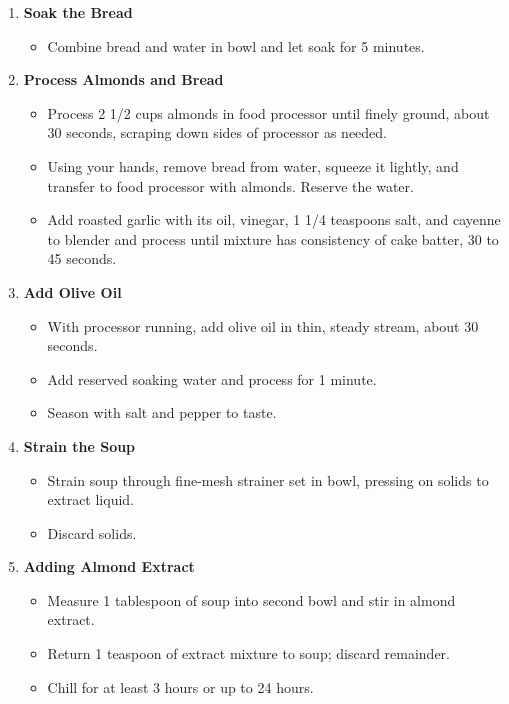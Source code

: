 \documentclass[11pt,letterpaper]{article}
\begin{document}
\begin{description}
\begin{enumerate}
	\item {\bf Soak the Bread}
	\begin{itemize}
	\item Combine bread and water in bowl and let soak for 5 minutes. 
	\end{itemize}
	
	\item {\bf Process Almonds and Bread}
	\begin{itemize}
	\item Process 2 1/2 cups almonds in food processor until finely ground, about 30 seconds, scraping down sides of processor as needed.
	\item Using your hands, remove bread from water, squeeze it lightly, and transfer to food processor with almonds. Reserve the water.
	\item Add roasted garlic with its oil, vinegar, 1 1/4 teaspoons salt, and cayenne to blender and process until mixture has consistency of cake batter, 30 to 45 seconds. 
	\end{itemize}	
	
	\item {\bf Add Olive Oil}
	\begin{itemize}
	\item  With processor running, add olive oil in thin, steady stream, about 30 seconds. 
	\item Add reserved soaking water and process for 1 minute. 
	\item Season with salt and pepper to taste. 
	\end{itemize}
	
	\item {\bf Strain the Soup}
	\begin{itemize}
	\item Strain soup through fine-mesh strainer set in bowl, pressing on solids to extract liquid.
	\item Discard solids.
	\end{itemize}
	
	\item {\bf Adding Almond Extract}
	\begin{itemize}
	\item Measure 1 tablespoon of soup into second bowl and stir in almond extract. 
	\item Return 1 teaspoon of extract mixture to soup; discard remainder. 
	\item Chill for at least 3 hours or up to 24 hours.
	\end{itemize}
	

\end{enumerate}
\end{description}
\end{document}
